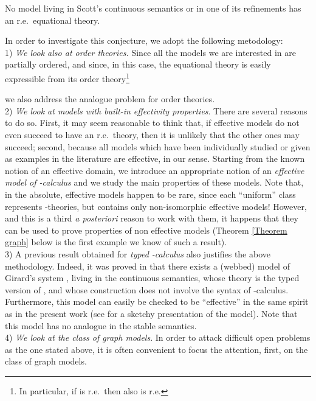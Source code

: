 \documentclass[english]{llncs}
\begin{document}
\begin{conjecture}\label{conj:ScottSemantics} 
No model living in Scott's continuous semantics or in one of its refinements has an r.e.\ equational theory.
\end{conjecture}

In order to investigate this conjecture, we adopt the following metodology:\\
1) {\em We look also at order theories.} Since all the models we are interested in are partially ordered, and since, in this case, 
the equational theory  is easily expressible from its order theory\footnote{
In particular, if  is r.e.\ then also  is r.e.
}
 
we also address the analogue problem for order theories.\\
2) {\em We look at models with built-in effectivity properties}. 
There are several reasons to do so. 
First, it may seem reasonable to think that, if effective models do not even succeed to have an r.e.\ theory, then it is
unlikely that the other ones may succeed; second, because all models which have been individually studied or given as examples in the literature are effective, in our sense.
Starting from the known notion of an effective domain, we introduce an appropriate notion of an \emph{effective model of -calculus}
and we study the main properties of these models. 
Note that, in the absolute, effective models happen to be rare, since each ``uniform'' class represents
 -theories, but contains only  non-isomorphic effective models! 
However, and this is a third \emph{a posteriori} reason to work with them, it happens that they can be used to prove 
properties of non effective models (Theorem \ref{Theorem graph} below is the first example we know of such a result).\\
3) A previous result obtained for \emph{typed -calculus} also justifies the above metho\-do\-logy. 
Indeed, it was proved in \cite{BerardiB02} that there exists a (webbed) model of Girard's system , 
living in the continuous semantics, whose theory is the typed version of , and whose
construction does not involve the syntax of -calculus. 
Furthermore, this model can easily be checked to be ``effective'' in the same spirit as in
the present work (see \cite[Appendix C]{BerardiB02} for a sketchy presentation of the model). 
Note that this model has no analogue in the stable semantics.\\
4) \emph{We look at the class of graph models}. 
In order to attack difficult open problems as the one stated above, it is often convenient to focus the attention, first, on the class of graph models.
\end{document}
